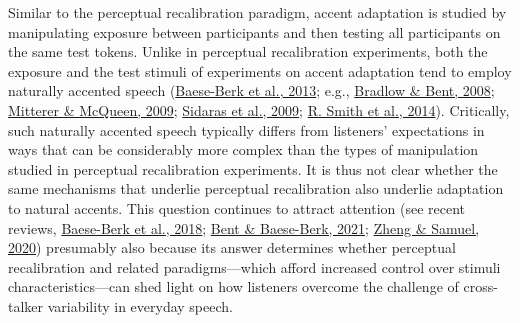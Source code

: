 \documentclass[
  11pt,
  english,
  man,floatsintext]{apa6}
\begin{document}
Similar to the perceptual recalibration paradigm, accent adaptation is studied by manipulating exposure between participants and then testing all participants on the same test tokens. Unlike in perceptual recalibration experiments, both the exposure and the test stimuli of experiments on accent adaptation tend to employ naturally accented speech (\protect\hyperlink{ref-baeseberk2013}{Baese-Berk et al., 2013}; e.g., \protect\hyperlink{ref-bradlow-bent2008}{Bradlow \& Bent, 2008}; \protect\hyperlink{ref-mitterer-mcqueen2009}{Mitterer \& McQueen, 2009}; \protect\hyperlink{ref-sidaras2009}{Sidaras et al., 2009}; \protect\hyperlink{ref-smith2014}{R. Smith et al., 2014}). Critically, such naturally accented speech typically differs from listeners' expectations in ways that can be considerably more complex than the types of manipulation studied in perceptual recalibration experiments. It is thus not clear whether the same mechanisms that underlie perceptual recalibration also underlie adaptation to natural accents. This question continues to attract attention (see recent reviews, \protect\hyperlink{ref-baeseberk2018}{Baese-Berk et al., 2018}; \protect\hyperlink{ref-bent-baeseberk2021}{Bent \& Baese-Berk, 2021}; \protect\hyperlink{ref-zheng-samuel2020}{Zheng \& Samuel, 2020}) presumably also because its answer determines whether perceptual recalibration and related paradigms---which afford increased control over stimuli characteristics---can shed light on how listeners overcome the challenge of cross-talker variability in everyday speech.
\end{document}
